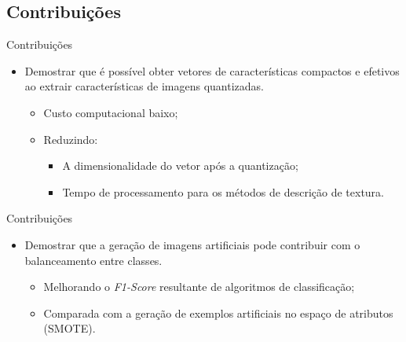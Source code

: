 \documentclass[10pt]{beamer}
\begin{document}
\subsection{Contribuições}
%
\begin{frame}{Contribuições}
  \setlength\leftmargini{1em}
    \begin{itemize}
    \item Demostrar que é possível obter vetores de características compactos e efetivos ao extrair características de imagens quantizadas.
    \begin{itemize}
      \item Custo computacional baixo;
      \item Reduzindo:
      \begin{itemize}
        \item A dimensionalidade do vetor após a quantização;
        \item Tempo de processamento para os métodos de descrição de textura.
      \end{itemize}
    \end{itemize}
  \end{itemize}
\end{frame}
\begin{frame}{Contribuições}
  \setlength\leftmargini{1em}
    \begin{itemize}
    \item Demostrar que a geração de imagens artificiais pode contribuir com o balanceamento entre classes.
    \begin{itemize}
      \item Melhorando o \textit{F1-Score} resultante de algoritmos de classificação;
      \item Comparada com a geração de exemplos artificiais no espaço de atributos (SMOTE).
    \end{itemize}
  \end{itemize}
\end{frame}
\end{document}
